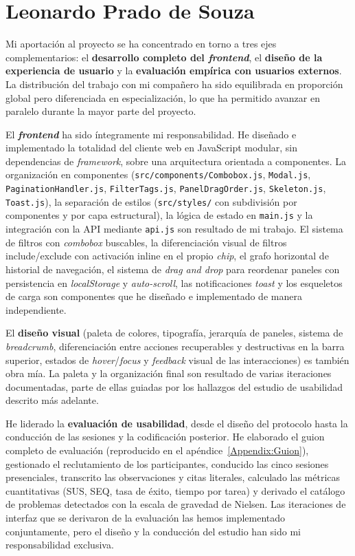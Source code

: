 \section*{Leonardo Prado de Souza}

Mi aportación al proyecto se ha concentrado en torno a tres ejes complementarios: el
\textbf{desarrollo completo del \textit{frontend}}, el \textbf{diseño de la experiencia de usuario} y
la \textbf{evaluación empírica con usuarios externos}. La distribución del trabajo con mi
compañero ha sido equilibrada en proporción global pero diferenciada en especialización, lo que
ha permitido avanzar en paralelo durante la mayor parte del proyecto.

El \textbf{\textit{frontend}} ha sido íntegramente mi responsabilidad. He diseñado e implementado la
totalidad del cliente web en JavaScript modular, sin dependencias de \textit{framework}, sobre
una arquitectura orientada a componentes. La organización en componentes
(\texttt{src/components/Combobox.js}, \texttt{Modal.js}, \texttt{PaginationHandler.js},
\texttt{FilterTags.js}, \texttt{PanelDragOrder.js}, \texttt{Skeleton.js}, \texttt{Toast.js}),
la separación de estilos (\texttt{src/styles/} con subdivisión por componentes y por capa
estructural), la lógica de estado en \texttt{main.js} y la integración con la API mediante
\texttt{api.js} son resultado de mi trabajo. El sistema de filtros con \textit{combobox}
buscables, la diferenciación visual de filtros include/exclude con activación inline en el
propio \textit{chip}, el grafo horizontal de historial de navegación, el sistema de
\textit{drag and drop} para reordenar paneles con persistencia en \textit{localStorage} y
\textit{auto-scroll}, las notificaciones \textit{toast} y los esqueletos de carga son
componentes que he diseñado e implementado de manera independiente.

El \textbf{diseño visual} (paleta de colores, tipografía, jerarquía de paneles, sistema de
\textit{breadcrumb}, diferenciación entre acciones recuperables y destructivas en la barra
superior, estados de \textit{hover}/\textit{focus} y \textit{feedback} visual de las interacciones) es
también obra mía. La paleta y la organización final son resultado de varias iteraciones
documentadas, parte de ellas guiadas por los hallazgos del estudio de usabilidad descrito más
adelante.

He liderado la \textbf{evaluación de usabilidad}, desde el diseño del protocolo hasta la
conducción de las sesiones y la codificación posterior. He elaborado el guion completo de
evaluación (reproducido en el apéndice~\ref{Appendix:Guion}), gestionado el reclutamiento de
los participantes, conducido las cinco sesiones presenciales, transcrito las observaciones y
citas literales, calculado las métricas cuantitativas (SUS, SEQ, tasa de éxito, tiempo por
tarea) y derivado el catálogo de problemas detectados con la escala de gravedad de Nielsen. Las
iteraciones de interfaz que se derivaron de la evaluación las hemos implementado conjuntamente,
pero el diseño y la conducción del estudio han sido mi responsabilidad exclusiva.

